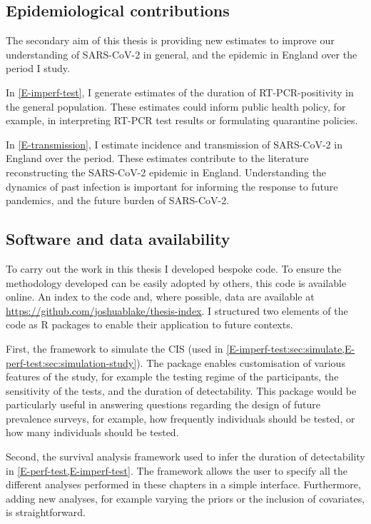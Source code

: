 \documentclass[thesis.tex]{subfiles}
\begin{document}
\subsection{Epidemiological contributions}

The secondary aim of this thesis is providing new estimates to improve our understanding of SARS-CoV-2 in general, and the epidemic in England over the period I study.

In \cref{E-imperf-test}, I generate estimates of the duration of RT-PCR-positivity in the general population.
These estimates could inform public health policy, for example, in interpreting RT-PCR test results or formulating quarantine policies.

In \cref{E-transmission}, I estimate incidence and transmission of SARS-CoV-2 in England over the period.
These estimates contribute to the literature reconstructing the SARS-CoV-2 epidemic in England.
Understanding the dynamics of past infection is important for informing the response to future pandemics, and the future burden of SARS-CoV-2.

\subsection{Software and data availability}

To carry out the work in this thesis I developed bespoke code.
To ensure the methodology developed can be easily adopted by others, this code is available online.
An index to the code and, where possible, data are available at \url{https://github.com/joshuablake/thesis-index}.
I structured two elements of the code as R packages to enable their application to future contexts.

First, the framework to simulate the CIS (used in \cref{E-imperf-test:sec:simulate,E-perf-test:sec:simulation-study}).
The package enables customisation of various features of the study, for example the testing regime of the participants, the sensitivity of the tests, and the duration of detectability.
This package would be particularly useful in answering questions regarding the design of future prevalence surveys, for example, how frequently individuals should be tested, or how many individuals should be tested.

Second, the survival analysis framework used to infer the duration of detectability in \cref{E-perf-test,E-imperf-test}.
The framework allows the user to specify all the different analyses performed in these chapters in a simple interface. 
Furthermore, adding new analyses, for example varying the priors or the inclusion of covariates, is straightforward.
\end{document}
